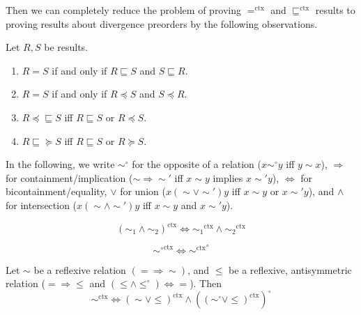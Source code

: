 \documentclass[acmsmall,screen,12pt]{acmart}
\newcommand{\ltdyn}{\sqsubseteq}
\newcommand{\ctxize}[1]{\mathrel{{#1}^{\text{ctx}}}}
\newcommand{\simsub}[1]{\mathrel{\sim_{#1}}}
\newcommand\errordivergeleft[0]{\preceq\ltdyn}
\newcommand\errordivergeright[0]{\ltdyn\succeq}
\begin{document}
{\begin{longonly}
Then we can completely reduce the problem of proving $\ctxize=$ and
$\ctxize\ltdyn$ results to proving results about divergence preorders
by the following observations.
\newcommand{\ctxsimi}[1]{\mathrel{\sim_{#1}^{\text{ctx}}}}
\begin{lemma} \label{lem:decomposing-result}
  Let $R, S$ be results.
  \begin{enumerate}
  \item $R = S$ if and only if $R \ltdyn S$ and $S \ltdyn R$.
  \item $R = S$ if and only if $R \preceq S$ and $S \preceq R$.
  \item $R \errordivergeleft S$ iff $R \ltdyn S$ or $R \preceq S$.
  \item $R \errordivergeright S$ iff $R \ltdyn S$ or $R \succeq S$.
  \end{enumerate}
\end{lemma}

In the following, we write $\sim^\circ$ for the opposite of a relation
($x \sim^\circ y$ iff $y \sim x$), $\Rightarrow$ for
containment/implication ($\sim \Rightarrow \sim'$ iff $x \sim y$ implies
$x \sim' y$), $\Leftrightarrow$ for bicontainment/equality, $\vee$ for
union ($x (\sim \vee \sim') y$ iff $x \sim y$ or $x \sim' y$), and
$\wedge$ for intersection ($x (\sim \wedge \sim') y$ iff $x \sim y$ and $x \sim' y$).

\begin{lemma} \label{lem:ctx-commutes-conjunction}
  \[
  \ctxize{(\simsub 1 \wedge \simsub 2)} \Leftrightarrow \ctxize{\simsub 1} \wedge \ctxize{\simsub 2}
  \]
\end{lemma}
 
\begin{lemma} \label{lem:ctx-commutes-dual}
  \[
  \ctxize{\sim^\circ} \Leftrightarrow \ctxize{\sim}^\circ
  \]
\end{lemma}

\begin{lemma} \label{lem:contextual-decomposition}
Let $\sim$ be a reflexive relation $(= \Rightarrow \sim)$, and $\leqslant$
be a reflexive, antisymmetric relation (${=} \Rightarrow {\leqslant}$ and
$(\leqslant \wedge {\leqslant^\circ}) \Leftrightarrow {=}$).  Then
\[
\ctxize\sim \Leftrightarrow \ctxize{(\sim \vee \leqslant)} \wedge (\ctxize{(\sim^\circ \vee \leqslant)})^\circ
\]
\end{lemma}


\end{longonly}}
\end{document}
